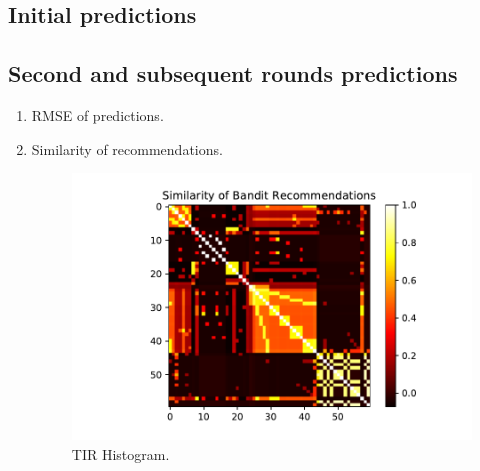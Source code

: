 \documentclass{article}
\begin{document}
\subsection{Initial predictions}



\subsection{Second and subsequent rounds predictions}

\begin{enumerate}
    \item RMSE of predictions.
    
    \item Similarity of recommendations. 
    \begin{figure}[t]
    \centering
    \includegraphics[scale=0.7]{plots/similarity_first_round_recommendation.pdf}
    \caption{TIR Histogram.}
    \label{fig: TIR Histogram.}
\end{figure}
\end{enumerate}{}


\newpage

\printbibliography
\end{document}
